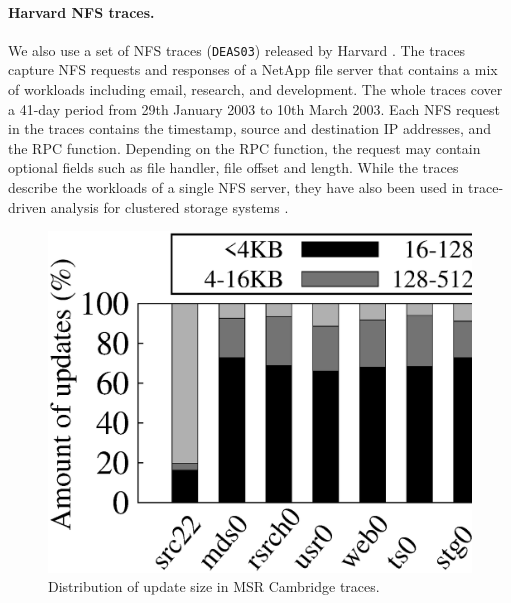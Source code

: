 
\paragraph{Harvard NFS traces.}  We also use a set of NFS traces
(\texttt{DEAS03}) released by Harvard \cite{ellard04}.  The traces capture NFS
requests and responses of a NetApp file server 
that contains a mix of workloads including email, research, and development.
The whole traces cover a 41-day period from 29th January 2003 to 10th March
2003.  Each NFS request in the traces contains the timestamp, source and
destination IP addresses, and the RPC function. 
Depending on the RPC function, the request may contain optional fields such as
file handler, file offset and length.  While the traces describe the
workloads of a single NFS server, they have also been used in trace-driven
analysis for clustered storage systems \cite{abd05,hendricks06}.


\begin{figure}[t]
    \centering
    \includegraphics[width=\linewidth]{charts/msr_dist/eps/msr_dist}
    \caption{Distribution of update size in MSR Cambridge traces.}
    \label{fig:msr_dist}
\end{figure}

